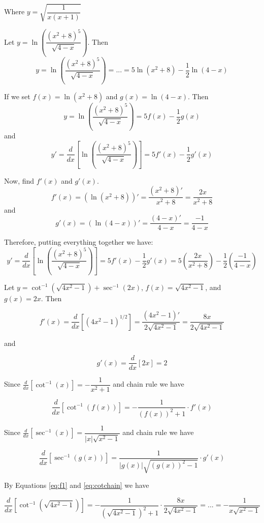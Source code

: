\documentclass{article}
\newcommand{\ddx}[1]{\frac{d}{dx}\left[#1\right]}
\newcommand{\newp}{\hrulefill \vskip 1cm}
\begin{document}
Where $y=\sqrt{\dfrac{1}{x(x+1)}}$

\newp
Let $y=\ln\left( \dfrac{(x^2+8)^5}{\sqrt{4-x}} \right)$. Then
\[
y=\ln\left( \dfrac{(x^2+8)^5}{\sqrt{4-x}} \right)=...=5\ln(x^2+8)-\frac12\ln(4-x)
\]

If we set $f(x)=\ln(x^2+8)$ and $g(x)=\ln(4-x)$. Then
\[
y=\ln\left( \dfrac{(x^2+8)^5}{\sqrt{4-x}} \right)=5f(x)-\frac12g(x)
\]
and
\[
y'=\ddx{\ln\left( \dfrac{(x^2+8)^5}{\sqrt{4-x}} \right)}=5f'(x)-\frac12g'(x)
\]

Now, find $f'(x)$ and $g'(x)$.
\[
f'(x)=\left(\ln(x^2+8)\right)'=\dfrac{\left( x^2+8 \right)'}{x^2+8}=\dfrac{2x}{x^2+8}
\]
and
\[
g'(x)=\left( \ln(4-x) \right)'=\dfrac{(4-x)'}{4-x}=\dfrac{-1}{4-x}
\]

Therefore, putting everything together we have:
\[
y'=\ddx{\ln\left( \dfrac{(x^2+8)^5}{\sqrt{4-x}} \right)}=5f'(x)-\frac12g'(x)=5\left(\dfrac{2x}{x^2+8}\right)-\frac12\left(\dfrac{-1}{4-x}\right)
\]

\newp
Let $y=\cot^{-1}\left( \sqrt{4x^2-1} \right)+\sec^{-1}(2x)$, $f(x)=\sqrt{4x^2-1}$, and $g(x)=2x$. Then

\begin{equation}\label{eq:f1}
    f'(x)=\ddx{(4x^2-1)^{1/2}}=\dfrac{(4x^2-1)'}{2\sqrt{4x^2-1}}=\dfrac{8x}{2\sqrt{4x^2-1}}
\end{equation}

and

\begin{equation}\label{eq:g1}
    g'(x)=\ddx{2x}=2
\end{equation}

Since $\ddx{\cot^{-1}(x)}=-\dfrac{1}{x^2+1}$ and chain rule we have

\begin{equation}\label{eq:cotchain}
    \ddx{\cot^{-1}(f(x))}=-\dfrac{1}{\left(f(x)\right)^2+1}\cdot f'(x)
\end{equation}

Since $\ddx{\sec^{-1}(x)}=\dfrac{1}{|x|\sqrt{x^2-1}}$ and chain rule we have

\begin{equation}\label{eq:secchain}
    \ddx{\sec^{-1}(g(x))}=\dfrac{1}{|g(x)|\sqrt{\left(g(x)\right)^2-1}}\cdot g'(x)
\end{equation}

By Equations \eqref{eq:f1} and \eqref{eq:cotchain} we have

\begin{equation}\label{eq:dcf1}
    \ddx{\cot^{-1}\left(\sqrt{4x^2-1}\right)}=-\dfrac{1}{\left(\sqrt{4x^2-1}\right)^2+1}\cdot \dfrac{8x}{2\sqrt{4x^2-1}}=...=-\dfrac{1}{x\sqrt{x^2-1}}
\end{equation}
\end{document}

